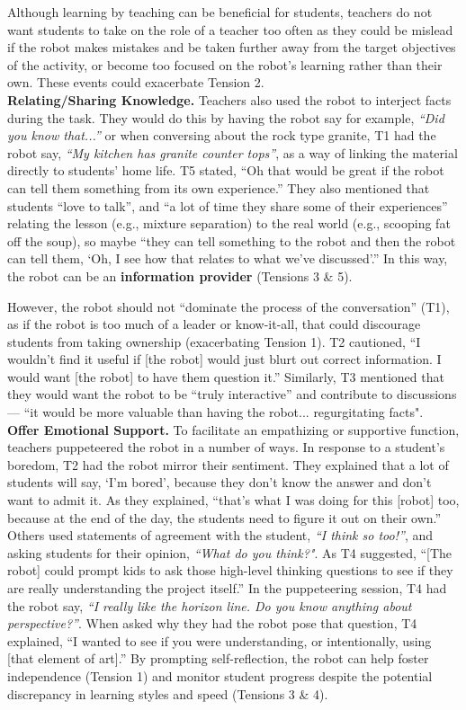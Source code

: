 Although learning by teaching can be beneficial for students, teachers do not want students to take on the role of a teacher too often as they could be mislead if the robot makes mistakes and be taken further away from the target objectives of the activity, or become too focused on the robot's learning rather than their own. These events could exacerbate Tension 2.\\


\textbf{Relating/Sharing Knowledge.} Teachers also used the robot to interject facts during the task. They would do this by having the robot say for example, \textit{``Did you know that...''} or when conversing about the rock type granite, T1 had the robot say, \textit{``My kitchen has granite counter tops”}, as a way of linking the material directly to students' home life. T5 stated, ``Oh that would be great if the robot can tell them something from its own experience.'' They also mentioned that students ``love to talk”, and ``a lot of time they share some of their experiences” relating the lesson (e.g., mixture separation) to the real world (e.g., scooping fat off the soup), so maybe ``they can tell something to the robot and then the robot can tell them, `Oh, I see how that relates to what we've discussed’.” In this way, the robot can be an \textbf{information provider} (Tensions 3 \& 5). 

However, the robot should not ``dominate the process of the conversation'' (T1), as if the robot is too much of a leader or know-it-all, that could discourage students from taking ownership (exacerbating Tension 1). T2 cautioned, ``I wouldn't find it useful if [the robot] would just blurt out correct information.  I would want [the robot] to have them question it.'' Similarly, T3 mentioned that they would want the robot to be ``truly interactive'' and contribute to discussions --- ``it would be more valuable than having the robot... regurgitating facts". \\


\textbf{Offer Emotional Support.} To facilitate an empathizing or supportive function, teachers puppeteered the robot in a number of ways. In response to a student's boredom, T2 had the robot mirror their sentiment. They explained that a lot of students will say, `I'm bored', because they don't know the answer and don't want to admit it. As they explained, ``that's what I was doing for this [robot] too, because at the end of the day, the students need to figure it out on their own.''
Others used statements of agreement with the student, \textit{``I think so too!''}, and asking students for their opinion, \textit{``What do you think?"}. As T4 suggested, ``[The robot] could prompt kids to ask those high-level thinking questions to see if they are really understanding the project itself.'' In the puppeteering session, T4 had the robot say, \textit{``I really like the horizon line. Do you know anything about perspective?''}.  When asked why they had the robot pose that question, T4 explained, ``I wanted to see if you were understanding, or intentionally, using [that element of art].''  By prompting self-reflection, the robot can help foster independence (Tension 1) and monitor student progress despite the potential discrepancy in learning styles and speed (Tensions 3 \& 4).   


